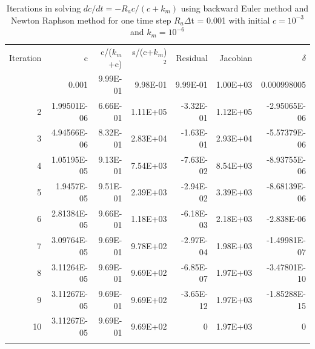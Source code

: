 \documentclass[gmd, manuscript]{copernicus}
\begin{document}
%


\clearpage

\begin{table}[t]
\caption{Iterations in solving $dc/dt=-R_ac/(c+k_m)$ using backward Euler method
and Newton Raphson method for one time step $R_a\Delta$t = 0.001 with
initial $c=10^{-3}$ and $k_m=10^{-6}$}
\label{table1}
\begin{tabular}{rrrrrrr}
\tophline
Iteration& c &	c/($k_m$+c)& s/(c+$k_m$)$^2$ & Residual	& Jacobian & $\delta$ \\
\middlehline
1 & 0.001	& 9.99E-01 & 9.98E-01 &	9.99E-01 &	1.00E+03 &  0.000998005 \\
2 & 1.99501E-06	& 6.66E-01 & 1.11E+05 &	-3.32E-01& 1.12E+05 &	-2.95065E-06 \\
3 & 4.94566E-06	& 8.32E-01 & 2.83E+04 &	-1.63E-01& 2.93E+04 &	-5.57379E-06 \\
4 & 1.05195E-05	& 9.13E-01 & 7.54E+03 &	-7.63E-02& 8.54E+03 &	-8.93755E-06 \\
5 & 1.9457E-05	& 9.51E-01 & 2.39E+03 &	-2.94E-02& 3.39E+03 &	-8.68139E-06 \\
6 & 2.81384E-05	& 9.66E-01 & 1.18E+03 &	-6.18E-03& 2.18E+03 &	-2.838E-06 \\
7 & 3.09764E-05	& 9.69E-01 & 9.78E+02 &	-2.97E-04& 1.98E+03 &	-1.49981E-07 \\
8 & 3.11264E-05	& 9.69E-01 & 9.69E+02 &	-6.85E-07& 1.97E+03 &	-3.47801E-10 \\
9 & 3.11267E-05	& 9.69E-01 & 9.69E+02 &	-3.65E-12& 1.97E+03 &	-1.85288E-15 \\
10 & 3.11267E-05 & 9.69E-01 & 9.69E+02 & 0 &	1.97E+03 &  0 \\
\bottomhline
\end{tabular}
\end{table}
\end{document}
